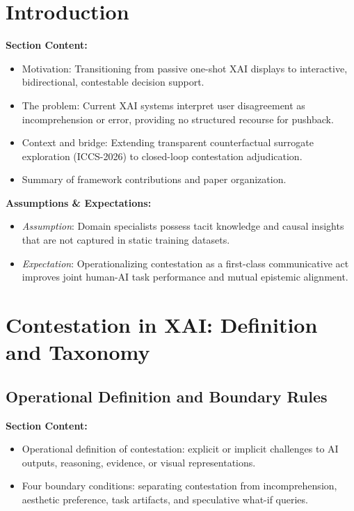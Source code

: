 \documentclass[preprint,12pt,3p,times]{elsarticle}
\begin{document}
\section{Introduction}
\label{sec:intro}

\textbf{Section Content:}
\begin{itemize}
    \item Motivation: Transitioning from passive one-shot XAI displays to interactive, bidirectional, contestable decision support.
    \item The problem: Current XAI systems interpret user disagreement as incomprehension or error, providing no structured recourse for pushback.
    \item Context and bridge: Extending transparent counterfactual surrogate exploration (ICCS-2026) to closed-loop contestation adjudication.
    \item Summary of framework contributions and paper organization.
\end{itemize}

\textbf{Assumptions \& Expectations:}
\begin{itemize}
    \item \emph{Assumption}: Domain specialists possess tacit knowledge and causal insights that are not captured in static training datasets.
    \item \emph{Expectation}: Operationalizing contestation as a first-class communicative act improves joint human-AI task performance and mutual epistemic alignment.
\end{itemize}

\section{Contestation in XAI: Definition and Taxonomy}
\label{sec:foundations}

\subsection{Operational Definition and Boundary Rules}
\textbf{Section Content:}
\begin{itemize}
    \item Operational definition of contestation: explicit or implicit challenges to AI outputs, reasoning, evidence, or visual representations.
    \item Four boundary conditions: separating contestation from incomprehension, aesthetic preference, task artifacts, and speculative what-if queries.
\end{itemize}
\end{document}
